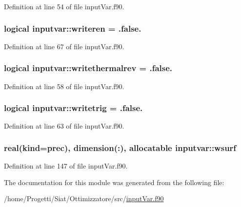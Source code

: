Definition at line 54 of file input\-Var.\-f90.

\hypertarget{classinputvar_aaea9119ed7c4fbad274831007b696f46}{
\subsubsection[{writeren}]{\setlength{\rightskip}{0pt plus 5cm}logical inputvar\-::writeren = .false.}}\label{classinputvar_aaea9119ed7c4fbad274831007b696f46}


Definition at line 67 of file input\-Var.\-f90.

\hypertarget{classinputvar_ae7817d3a1abb7e02fdd1d3f40b45a4e8}{
\subsubsection[{writethermalrev}]{\setlength{\rightskip}{0pt plus 5cm}logical inputvar\-::writethermalrev = .false.}}\label{classinputvar_ae7817d3a1abb7e02fdd1d3f40b45a4e8}


Definition at line 58 of file input\-Var.\-f90.

\hypertarget{classinputvar_a676701049b4d18d378d94894b1fcae7b}{
\subsubsection[{writetrig}]{\setlength{\rightskip}{0pt plus 5cm}logical inputvar\-::writetrig = .false.}}\label{classinputvar_a676701049b4d18d378d94894b1fcae7b}


Definition at line 63 of file input\-Var.\-f90.

\hypertarget{classinputvar_a14476d610b1d64d08f3681482a8e82b8}{
\subsubsection[{wsurf}]{\setlength{\rightskip}{0pt plus 5cm}real(kind=prec), dimension(\-:), allocatable inputvar\-::wsurf}}\label{classinputvar_a14476d610b1d64d08f3681482a8e82b8}


Definition at line 147 of file input\-Var.\-f90.



The documentation for this module was generated from the following file\-:\begin{DoxyCompactItemize}
\item 
/home/\-Progetti/\-Siat/\-Ottimizzatore/src/\hyperlink{input_var_8f90}{input\-Var.\-f90}\end{DoxyCompactItemize}
